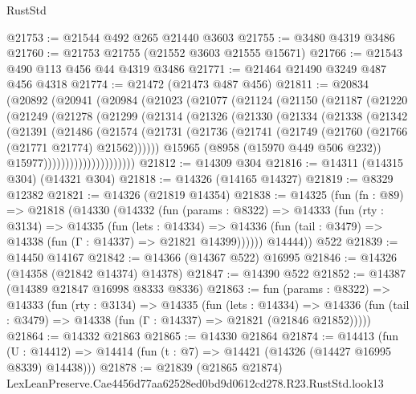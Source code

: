 \begin{lexlean}{RustStd}
\begin{coremodule}
@21753 := @21544 @492 @265 @21440 @3603
@21755 := @3480 @4319 @3486
@21760 := @21753 @21755 (@21552 @3603 @21555 @15671)
@21766 := @21543 @490 @113 @456 @44 @4319 @3486
@21771 := @21464 @21490 @3249 @487 @456 @4318
@21774 := @21472 (@21473 @487 @456)
@21811 := @20834
    (@20892
      (@20941
        (@20984
          (@21023
            (@21077
              (@21124
                (@21150
                  (@21187
                    (@21220
                      (@21249
                        (@21278
                          (@21299
                            (@21314
                              (@21326
                                (@21330
                                  (@21334
                                    (@21338
                                      (@21342
                                        (@21391
                                          (@21486
                                            (@21574
                                              (@21731
                                                (@21736
                                                  (@21741
                                                    (@21749
                                                      (@21760 (@21766 (@21771 @21774) @21562))))))
                                              @15965
                                              (@8958 (@15970 @449 @506 @232))
                                              @15977)))))))))))))))))))))
@21812 := @14309 @304
@21816 := @14311 (@14315 @304) (@14321 @304)
@21818 := @14326 (@14165 @14327)
@21819 := @8329 @12382
@21821 := @14326 (@21819 @14354)
@21838 := @14325
    (fun (fn : @89) =>
    @21818
      (@14330
        (@14332
          (fun (params : @8322) =>
          @14333
            (fun (rty : @3134) =>
            @14335
              (fun (lets : @14334) =>
              @14336 (fun (tail : @3479) => @14338 (fun (Γ : @14337) => @21821 @14399))))))
        @14444))
    @522
@21839 := @14450 @14167
@21842 := @14366 (@14367 @522) @16995
@21846 := @14326 (@14358 (@21842 @14374) @14378)
@21847 := @14390 @522
@21852 := @14387 (@14389 @21847 @16998 @8333 @8336)
@21863 := fun (params : @8322) =>
  @14333
    (fun (rty : @3134) =>
    @14335
      (fun (lets : @14334) =>
      @14336 (fun (tail : @3479) => @14338 (fun (Γ : @14337) => @21821 (@21846 @21852)))))
@21864 := @14332 @21863
@21865 := @14330 @21864
@21874 := @14413
    (fun (U : @14412) => @14414 (fun (t : @7) => @14421 (@14326 (@14427 @16995 @8339) @14438)))
@21878 := @21839
    (@21865 @21874)
    LexLeanPreserve.Cae4456d77aa62528ed0bd9d0612cd278.R23.RustStd.look13

\end{coremodule}
\end{lexlean}
